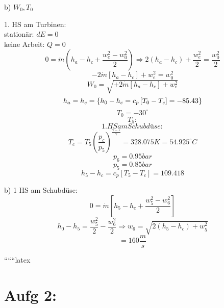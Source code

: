 b) $W_0, T_0$

1. HS am Turbinen: \\
stationär: $dE = 0$ \\
keine Arbeit: $Q = 0$ \\
\[
0 = \dot{m} \left( h_a - h_c + \frac{w_e^2 - w_0^2}{2} \right) \Rightarrow 2(h_a - h_c) + \frac{w_e^2}{2} = \frac{w_0^2}{2}
\]
\[
-2 \dot{m} \left[ h_a - h_c \right] + w_e^2 = w_0^2
\]
\[
W_0 = \sqrt{+2 \dot{m} \left[ h_a - h_c \right] + w_e^2}
\]
\[
h_a = \\
h_c = \left\{ h_0 - h_c = c_p \left[ T_0 - T_c \right] = -85.43 \right\}
\]
\[
T_0 = -30^\circ
\]
\[
T_5:
\]
\[
1. HS am Schubdüse:
\]
\[
T_c = T_5 \left( \frac{p_c}{p_5} \right)^{\frac{\gamma - 1}{\gamma}} = 328.075 K = 54.925^\circ C
\]
\[
p_6 = 0.95 bar
\]
\[
p_5 = 0.85 bar
\]
\[
h_5 - h_c = c_p \left[ T_5 - T_c \right] = 109.418
\]

b) 1 HS am Schubdüse:
\[
0 = \dot{m} \left[ h_5 - h_c + \frac{w_5^2 - w_6^2}{2} \right]
\]
\[
h_0 - h_5 = \frac{w_5^2}{2} - \frac{w_6^2}{2} \Rightarrow w_6 = \sqrt{2(h_5 - h_c) + w_5^2}
\]
\[
= 160 \frac{m}{s}
\]

``````latex


\section*{Aufg 2:}